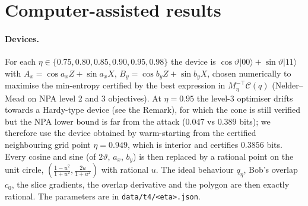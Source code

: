 \documentclass[11pt]{article}
\theoremstyle{definition}\newtheorem{definition}{Definition}
\theoremstyle{remark}\newtheorem{remark}{Remark}
\begin{document}
\section{Computer-assisted results}
\paragraph{Devices.} For each $\eta\in\{0.75,0.80,0.85,0.90,0.95,0.98\}$ the device is $\cos\vartheta|00\rangle+\sin\vartheta|11\rangle$ with $A_x=\cos a_x Z+\sin a_x X$, $B_y=\cos b_y Z+\sin b_y X$, chosen numerically to maximise the min-entropy certified by the best expression in $M_\eta^{-\top}\mathcal C(q)$ (Nelder--Mead on NPA level 2 and 3 objectives). At $\eta=0.95$ the level-3 optimiser drifts towards a Hardy-type device (see the Remark), for which the cone is still verified but the NPA lower bound is far from the attack ($0.047$ vs $0.389$ bits); we therefore use the device obtained by warm-starting from the certified neighbouring grid point $\eta=0.949$, which is interior and certifies $0.3856$ bits. Every cosine and sine (of $2\vartheta$, $a_x$, $b_y$) is then replaced by a rational point on the unit circle, $(\frac{1-u^2}{1+u^2},\frac{2u}{1+u^2})$ with rational $u$. The ideal behaviour $q_\eta$, Bob's overlap $c_0$, the slice gradients, the overlap derivative and the polygon are then exactly rational. The parameters are in \texttt{data/t4/<eta>.json}.
\end{document}
